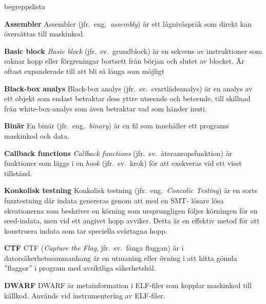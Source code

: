 \begin{labeling}{begreppslista}

    \item [\textbf{Assembler}] Assembler (jfr.\ eng.\ \emph{assembly}) är ett
    lågnivåspråk som direkt kan översättas till maskinkod.

    \item[\textbf{Basic block}] \emph{Basic block} (jfr.\ sv.\ grundblock) är en
    sekvens av instruktioner som saknar hopp eller förgreningar bortsett från
    början och slutet av blocket. Är oftast expanderade till att bli så långa
    som möjligt

    \item [\textbf{Black-box analys}] Black-box analys (jfr.\ sv.\
    svartlådeanalys) är en analys av ett objekt som endast betraktar dess
    yttre utseende och beteende, till skillnad från white-box-analys som även
    betraktar vad som händer inuti.

    \item [\textbf{Binär}] En binär (jfr.\ eng.\ \emph{binary}) är en fil som
    innehåller ett programs maskinkod och data.

    \item [\textbf{Callback functions}] \emph{Callback functions} (jfr.\ sv.\
    återanropsfunktion) är funktioner som läggs i en \emph{hook} (jfr.\ sv.\ krok) för
    att exekveras vid ett visst tillstånd.


    \item [\textbf{Konkolisk testning}] Konkolisk testning (jfr.\ eng.\ \emph{Concolic
        Testing}) är en sorts fuzztestning där indata genereras genom att med en SMT-
    lösare lösa ekvationerna som beskriver en körning som ursprungligen följer
    körningen för en seed-indata, men vid ett angivet hopp avviker. Detta är en
    effektiv metod för att konstruera indata som tar speciella svårtagna hopp.

    \item [\textbf{CTF}] CTF (\emph{Capture the Flag}, jfr.\ sv.\ fånga
        flaggan) är i datorsäkerhetssammanhang är en utmaning eller övning i att
    hitta gömda ''flaggor'' i program med avsiktliga säkerhetshål.

    \item [\textbf{DWARF}] DWARF är metainformation i
    ELF-filer som kopplar maskinkod till källkod. Används vid instrumentering av
    ELF-filer.


\end{labeling}
